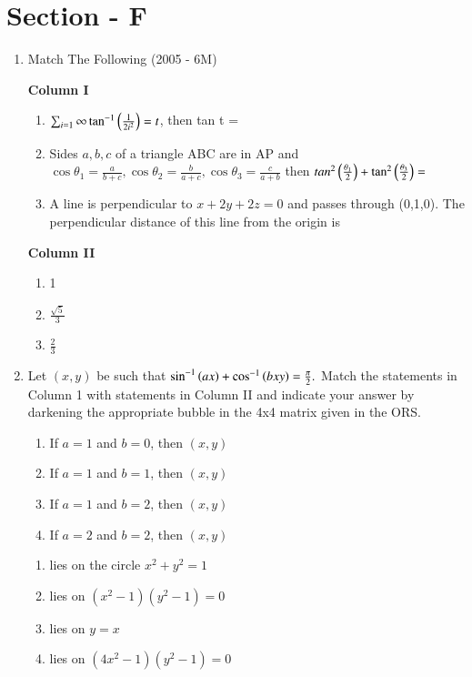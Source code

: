 \documentclass[journal,12pt,twocolumn]{IEEEtran}
\theoremstyle{remark}
\begin{document}
\section*{Section - F}
\begin{enumerate}
	\item{
		Match The Following \hfill (2005 - 6M)
		\begin{multicols}{2}
			\textbf{Column I}\\
			\begin{enumerate}
				\item{$\sum_{i=1}{\infty}\tan^{-1}\left(\frac{1}{2i^2}\right)=t$, then tan t =}\\
				\item{Sides $a,b,c$ of a triangle ABC are in AP and $\cos\theta_1=\frac{a}{b+c}, \cos\theta_2=\frac{b}{a+c}, \cos\theta_3=\frac{c}{a+b}$ then $tan^2\left(\frac{\theta_1}{2}\right)+\tan^2\left(\frac{\theta_3}{2}\right) = $}\\
				\item{A line is perpendicular to $x+2y+2z=0$ and passes through (0,1,0). The perpendicular distance of this line from the origin is}
			\end{enumerate}
			\columnbreak
			\textbf{Column II}\\
			\begin{enumerate}
				\item{1}\\
				\item{$\frac{\sqrt{5}}{3}$}\\
				\item{$\frac{2}{3}$}
			\end{enumerate}
		\end{multicols}}
	\item{
		Let $(x,y)$ be such that $\sin^{-1}\left(ax\right)+\cos^{-1}\left(bxy\right)=\frac{\pi}{2}.\\$
		Match the statements in Column 1 with statements in Column II and indicate your answer by darkening the appropriate bubble in the 4x4 matrix given in the ORS.
		\begin{multicols}{2}
			\begin{enumerate}
				\item{If $a=1$ and $b=0$, then $(x, y)$}
				\item{If $a=1$ and $b=1$, then $(x, y)$}
				\item{If $a=1$ and $b=2$, then $(x, y)$}
				\item{If $a=2$ and $b=2$, then $(x, y)$}
			\end{enumerate}
			\columnbreak
			\begin{enumerate}
				\item{lies on the circle $x^2 + y^2 = 1$}
				\item{lies on $(x^2-1)(y^2-1)=0$}
				\item{lies on $y=x$}
				\item{lies on $(4x^2-1)(y^2-1)=0$}
			\end{enumerate}
		\end{multicols}}
	

\end{enumerate}
\end{document}
